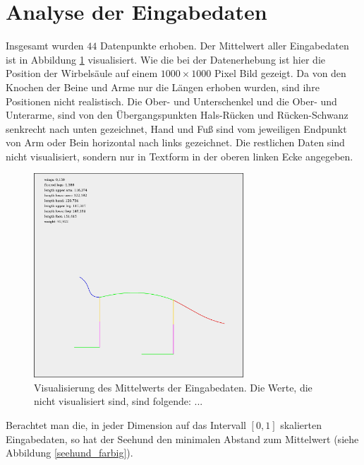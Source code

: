  \section{Analyse der Eingabedaten}
 \label{pca_input_analysis}
 
 Insgesamt wurden $44$ Datenpunkte erhoben.  Der Mittelwert aller Eingabedaten ist in Abbildung \ref{mean_log_weight} visualisiert.
 Wie die bei der Datenerhebung ist hier die Position der Wirbelsäule auf einem $1000 \times 1000$ Pixel Bild gezeigt. Da von den Knochen der Beine und Arme nur die Längen erhoben wurden, sind ihre Positionen nicht realistisch. Die Ober- und Unterschenkel und die Ober- und Unterarme, sind von den Übergangspunkten Hals-Rücken und Rücken-Schwanz senkrecht nach unten gezeichnet, Hand und Fuß sind vom jeweiligen Endpunkt von Arm oder Bein horizontal nach links gezeichnet. Die restlichen Daten sind nicht visualisiert, sondern nur in Textform in der oberen linken Ecke angegeben.
 
 \begin{figure}
  \centering
  \includegraphics[width=0.7\textwidth]{../PCA/mean_log_weight.jpg}
  \caption{Visualisierung des Mittelwerts der Eingabedaten. Die Werte, die nicht visualisiert sind, sind folgende: ...}
  \label{mean_log_weight}
 \end{figure}
 
 Berachtet man die, in jeder Dimension auf das Intervall $[0, 1]$ skalierten Eingabedaten, so hat der Seehund den minimalen Abstand zum Mittelwert (siehe Abbildung \ref{seehund_farbig}).
 
